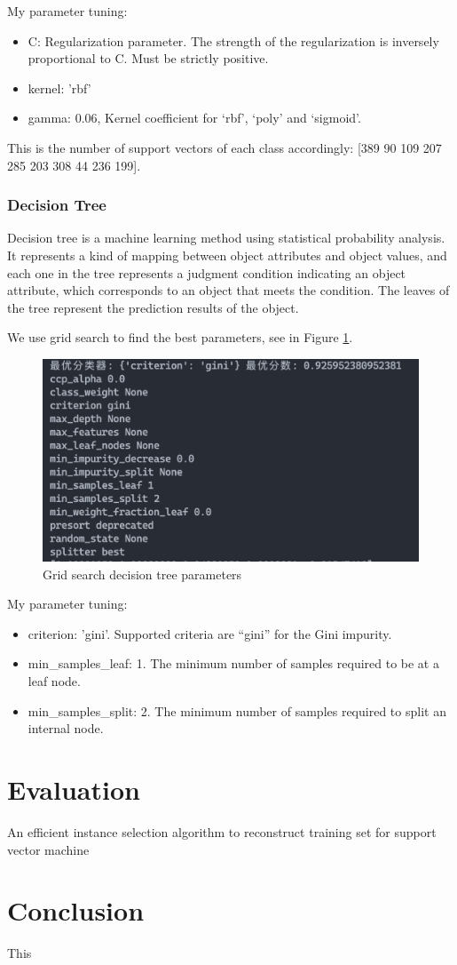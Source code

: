 \documentclass[11pt,en]{elegantpaper}
\begin{document}
My parameter tuning:
\begin{itemize}
	\item C: Regularization parameter. The strength of the regularization is inversely proportional to C. Must be strictly positive. 
	\item kernel: 'rbf'
	\item gamma: 0.06, Kernel coefficient for ‘rbf’, ‘poly’ and ‘sigmoid’.


\end{itemize}


This is the number of support vectors of each class accordingly: [389  90 109 207 285 203 308  44 236 199].
\subsubsection{Decision Tree}
Decision tree is a machine learning method using statistical probability analysis. It represents a kind of mapping between object attributes and object values, and each one in the tree represents a judgment condition indicating an object attribute, which corresponds to an object that meets the condition. The leaves of the tree represent the prediction results of the object.

We use grid search to find the best parameters, see in Figure \ref{bestdt}.
\begin{figure}[h]
	\centering
	\includegraphics[width=.5\textwidth]{image/bestdt}
	\caption{Grid search decision tree parameters}
	\label{bestdt}
\end{figure}

My parameter tuning:
\begin{itemize}
	\item criterion: 'gini'. Supported criteria are “gini” for the Gini impurity.
	\item min\_samples\_leaf: 1. The minimum number of samples required to be at a leaf node. 
	\item min\_samples\_split: 2. The minimum number of samples required to split an internal node.
\end{itemize}


\section{Evaluation}
An efficient instance selection algorithm to reconstruct training set for support vector machine\cite{liu2017efficient}

\section{Conclusion}
This 



\end{document}
